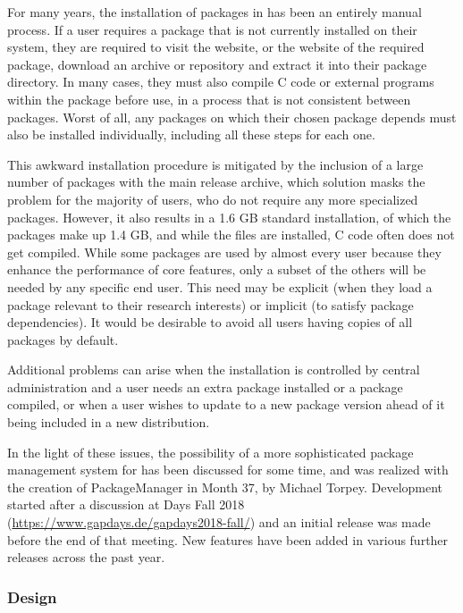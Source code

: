 For many years, the installation of packages in \GAP has been an
entirely manual process.  If a user requires a package that is not
currently installed on their system, they are required to visit the
\GAP website, or the website of the required package, download an
archive or repository and extract it into their package directory.  In
many cases, they must also compile C code or external programs
within the package before use, in a process that is not consistent
between packages.  Worst of all, any packages on which their chosen
package depends must also be installed individually, including all
these steps for each one.

This awkward installation procedure is mitigated by the inclusion of a
large number of packages with the main release archive, which solution
masks the problem for the majority of users, who do not require any
more specialized packages.  However, it also results in a 1.6 GB
standard installation, of which the packages make up 1.4 GB, and while
the files are installed, C code often does not get compiled. While
some packages are used by almost every \GAP user because they enhance
the performance of core \GAP features, only a subset of the others
will be needed by any specific end user. This need may be explicit (when
they load a package relevant to their research interests) or implicit
(to satisfy package dependencies). It would be desirable to avoid all
users having copies of all packages by default.

Additional problems can arise when the \GAP installation is controlled
by central administration and a user needs an extra package installed or a
package compiled, or when a user wishes to update to a new package
version ahead of it being included in a new \GAP distribution.


In the light of these issues, the possibility of a more sophisticated
package management system for \GAP has been discussed for some time,
and was realized with the creation of {\sf PackageManager}
\cite{PackageManager} in Month 37, by Michael Torpey.  Development
started after a discussion at \GAP Days Fall 2018
(\url{https://www.gapdays.de/gapdays2018-fall/}) and an initial
release was made before the end of that meeting.  New features have
been added in various further releases across the past year.

\subsubsection{Design}

